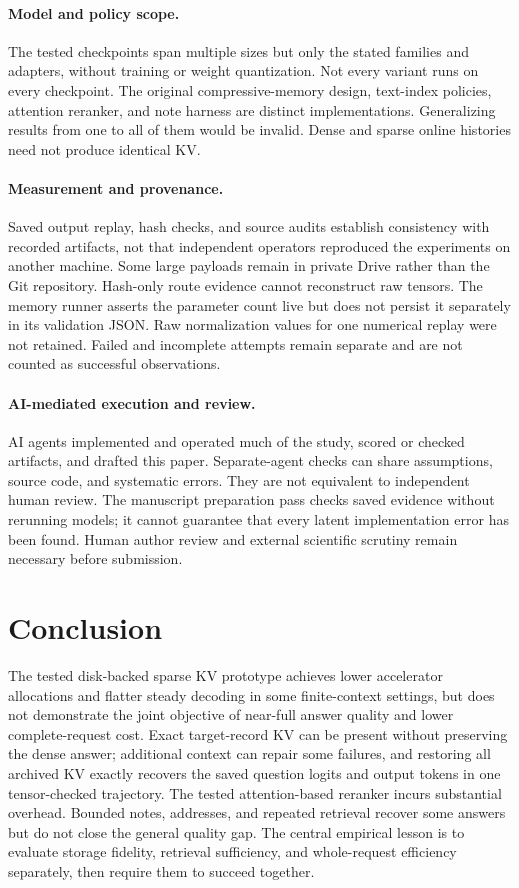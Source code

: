 \documentclass[11pt,letterpaper]{article}
\begin{document}
\paragraph{Model and policy scope.} The tested checkpoints span multiple sizes but only the stated families and adapters, without training or weight quantization. Not every variant runs on every checkpoint. The original compressive-memory design, text-index policies, attention reranker, and note harness are distinct implementations. Generalizing results from one to all of them would be invalid. Dense and sparse online histories need not produce identical KV.

\paragraph{Measurement and provenance.} Saved output replay, hash checks, and source audits establish consistency with recorded artifacts, not that independent operators reproduced the experiments on another machine. Some large payloads remain in private Drive rather than the Git repository. Hash-only route evidence cannot reconstruct raw tensors. The memory runner asserts the parameter count live but does not persist it separately in its validation JSON. Raw normalization values for one numerical replay were not retained. Failed and incomplete attempts remain separate and are not counted as successful observations.

\paragraph{AI-mediated execution and review.} AI agents implemented and operated much of the study, scored or checked artifacts, and drafted this paper. Separate-agent checks can share assumptions, source code, and systematic errors. They are not equivalent to independent human review. The manuscript preparation pass checks saved evidence without rerunning models; it cannot guarantee that every latent implementation error has been found. Human author review and external scientific scrutiny remain necessary before submission.

\section{Conclusion}
The tested disk-backed sparse KV prototype achieves lower accelerator allocations and flatter steady decoding in some finite-context settings, but does not demonstrate the joint objective of near-full answer quality and lower complete-request cost. Exact target-record KV can be present without preserving the dense answer; additional context can repair some failures, and restoring all archived KV exactly recovers the saved question logits and output tokens in one tensor-checked trajectory. The tested attention-based reranker incurs substantial overhead. Bounded notes, addresses, and repeated retrieval recover some answers but do not close the general quality gap. The central empirical lesson is to evaluate storage fidelity, retrieval sufficiency, and whole-request efficiency separately, then require them to succeed together.
\end{document}
